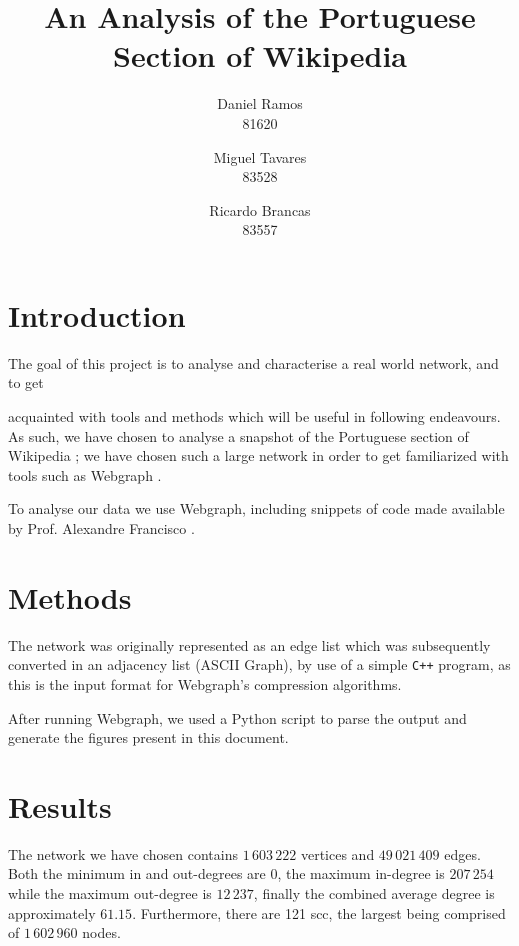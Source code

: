 \documentclass[9pt,a4paper,twocolumn]{article}
\title{An Analysis of the Portuguese Section of Wikipedia}
\author{Daniel Ramos \\ 81620 \and Miguel Tavares \\ 83528 \and Ricardo Brancas  \\ 83557}
\begin{document}
\maketitle

\section{Introduction}
The goal of this project is to analyse and characterise a real world network, and to  get 

acquainted with tools and methods which will be useful in following endeavours.
As such, we have chosen to analyse a snapshot of the Portuguese section of Wikipedia \cite{dataset};
we have chosen such a large network in order to get familiarized with tools such as Webgraph \cite{webgraph}.


To analyse our data we use Webgraph, including snippets of code made available
by Prof. Alexandre Francisco \cite{aplf}.

\section{Methods}
The network was originally represented as an edge list which was subsequently converted in an adjacency list (ASCII Graph), by use of a simple \texttt{C++} program, as this is the input
format for Webgraph's compression algorithms.

After running Webgraph, we used a Python script to parse the output and generate the figures present in this document.


\section{Results}

The network we have chosen contains $1\,603\,222$ vertices and $49\,021\,409$ edges. Both the minimum in and out-degrees are $0$, the maximum in-degree is $207\,254$ while the maximum out-degree is $12\,237$, finally the combined average degree is approximately $61.15$. Furthermore, there are 121 \acrlong{scc}, the largest being comprised of $1\,602\,960$ nodes.
\vspace{1\baselineskip}
\end{document}
